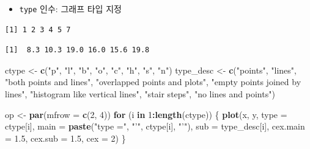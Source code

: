 \documentclass[
  11pt,
]{krantz}
\newenvironment{Shaded}{\begin{snugshade}}{\end{snugshade}}
\newcommand{\CommentTok}[1]{\textcolor[rgb]{0.37,0.37,0.37}{\textit{#1}}}
\newcommand{\ControlFlowTok}[1]{\textcolor[rgb]{0.27,0.27,0.27}{\textbf{#1}}}
\newcommand{\DataTypeTok}[1]{\textcolor[rgb]{0.27,0.27,0.27}{#1}}
\newcommand{\DecValTok}[1]{\textcolor[rgb]{0.06,0.06,0.06}{#1}}
\newcommand{\FloatTok}[1]{\textcolor[rgb]{0.06,0.06,0.06}{#1}}
\newcommand{\KeywordTok}[1]{\textcolor[rgb]{0.27,0.27,0.27}{\textbf{#1}}}
\newcommand{\NormalTok}[1]{#1}
\newcommand{\OperatorTok}[1]{\textcolor[rgb]{0.43,0.43,0.43}{\textbf{#1}}}
\newcommand{\StringTok}[1]{\textcolor[rgb]{0.5,0.5,0.5}{#1}}
\providecommand{\tightlist}{%
  \setlength{\itemsep}{0pt}\setlength{\parskip}{0pt}}
\begin{document}
\normalsize

\begin{itemize}
\tightlist
\item
  \texttt{type} 인수: 그래프 타입 지정
\end{itemize}

\footnotesize

\begin{Shaded}
\end{Shaded}

\begin{verbatim}
[1] 1 2 3 4 5 7
\end{verbatim}

\begin{verbatim}
[1]  8.3 10.3 19.0 16.0 15.6 19.8
\end{verbatim}

\begin{Shaded}
\begin{Highlighting}[]
\NormalTok{ctype <-}\StringTok{ }\KeywordTok{c}\NormalTok{(}\StringTok{"p"}\NormalTok{, }\StringTok{"l"}\NormalTok{, }\StringTok{"b"}\NormalTok{, }\StringTok{"o"}\NormalTok{, }\StringTok{"c"}\NormalTok{, }\StringTok{"h"}\NormalTok{, }\StringTok{"s"}\NormalTok{, }\StringTok{"n"}\NormalTok{)}
\NormalTok{type_desc <-}\StringTok{ }\KeywordTok{c}\NormalTok{(}\StringTok{"points"}\NormalTok{, }\StringTok{"lines"}\NormalTok{, }
               \StringTok{"both points and lines"}\NormalTok{, }
               \StringTok{"overlapped points and plots"}\NormalTok{, }
               \StringTok{"empty points joined by lines"}\NormalTok{, }
               \StringTok{"histogram like vertical lines"}\NormalTok{, }
               \StringTok{"stair steps"}\NormalTok{, }
               \StringTok{"no lines and points"}\NormalTok{)}

\NormalTok{op <-}\StringTok{ }\KeywordTok{par}\NormalTok{(}\DataTypeTok{mfrow =} \KeywordTok{c}\NormalTok{(}\DecValTok{2}\NormalTok{, }\DecValTok{4}\NormalTok{))}
\ControlFlowTok{for}\NormalTok{ (i }\ControlFlowTok{in} \DecValTok{1}\OperatorTok{:}\KeywordTok{length}\NormalTok{(ctype)) \{}
  \KeywordTok{plot}\NormalTok{(x, y, }
       \DataTypeTok{type =}\NormalTok{ ctype[i], }
       \DataTypeTok{main =} \KeywordTok{paste}\NormalTok{(}\StringTok{"type ="}\NormalTok{, }\StringTok{"'"}\NormalTok{, ctype[i], }\StringTok{"'"}\NormalTok{),}
       \DataTypeTok{sub =}\NormalTok{ type_desc[i], }
       \DataTypeTok{cex.main =} \FloatTok{1.5}\NormalTok{, }
       \DataTypeTok{cex.sub =} \FloatTok{1.5}\NormalTok{, }
       \DataTypeTok{cex =} \DecValTok{2}\NormalTok{)}
\NormalTok{\}}
\end{Highlighting}
\end{Shaded}
\end{document}
